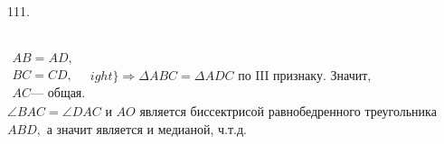 111. \begin{figure}[ht!]
\end{figure}\\
$\left.\begin{array}{l}AB=AD,\\
BC=CD,\\
AC\text{--- общая.}  \end{array}
ight\}\Rightarrow \Delta ABC=\Delta ADC\text{ по III признаку.}$ Значит, $\angle BAC=\angle DAC$ и $AO$ является биссектрисой равнобедренного треугольника $ABD,$ а значит является и медианой, ч.т.д.\\
